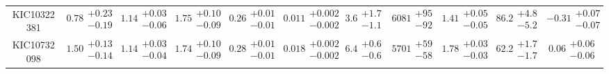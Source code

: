 \begin{tabular}{crrrrrrrrrr}
  KIC10322381 &  $0.78\substack{+0.23 \\ -0.19}$ &  $1.14\substack{+0.03 \\ -0.06}$ &  $1.75\substack{+0.10 \\ -0.09}$ &  $0.26\substack{+0.01 \\ -0.01}$ &  $0.011\substack{+0.002 \\ -0.002}$ &  $3.6\substack{+1.7 \\ -1.1}$ &  $6081\substack{+95 \\ -92}$ &  $1.41\substack{+0.05 \\ -0.05}$ &   $86.2\substack{+4.8 \\ -5.2}$ &          $-0.31\substack{+0.07 \\ -0.07}$ \\
  KIC10732098 &  $1.50\substack{+0.13 \\ -0.14}$ &  $1.14\substack{+0.03 \\ -0.04}$ &  $1.74\substack{+0.10 \\ -0.09}$ &  $0.28\substack{+0.01 \\ -0.01}$ &  $0.018\substack{+0.002 \\ -0.002}$ &  $6.4\substack{+0.6 \\ -0.6}$ &  $5701\substack{+59 \\ -58}$ &  $1.78\substack{+0.03 \\ -0.03}$ &   $62.2\substack{+1.7 \\ -1.7}$ &           $0.06\substack{+0.06 \\ -0.06}$ \\
\bottomrule
\end{tabular}
